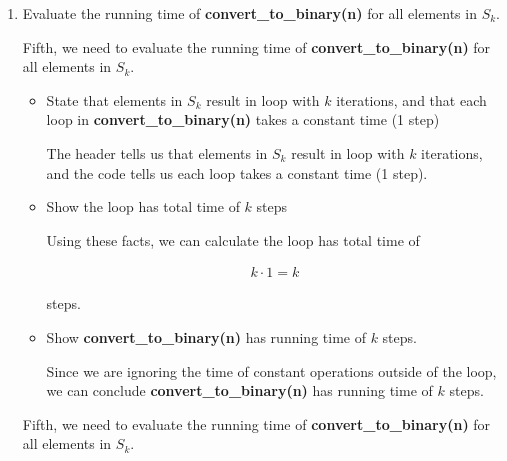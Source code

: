 \documentclass[12pt]{article}
\begin{document}
\begin{enumerate}[a.]
\begin{mdframed}
\begin{enumerate}[1.]
\begin{mdframed}
        \end{mdframed}

        \item Evaluate the running time of \textbf{convert\_to\_binary(n)} for all
        elements in $S_k$.

        \bigskip

        Fifth, we need to evaluate the running time of \textbf{convert\_to\_binary(n)}
        for all elements in $S_k$.

        \bigskip

        \begin{itemize}
            \item State that elements in $S_k$ result in loop with $k$ iterations, and
            that each loop in \textbf{convert\_to\_binary(n)} takes
            a constant time (1 step)

            \begin{mdframed}
            The header tells us that elements in $S_k$ result in loop with $k$ iterations, and
            the code tells us each loop takes a constant time (1 step).
            \end{mdframed}

            \item Show the loop has total time of $k$ steps

            \begin{mdframed}
            Using these facts, we can calculate the loop has total time of

            \begin{align}
                k \cdot 1 = k
            \end{align}

            steps.
            \end{mdframed}

            \item Show \textbf{convert\_to\_binary(n)} has running time of $k$ steps.

            \begin{mdframed}
            Since we are ignoring the time of constant operations outside of the loop,
            we can conclude \textbf{convert\_to\_binary(n)} has running time of $k$ steps.
            \end{mdframed}
        \end{itemize}

        \begin{mdframed}

        Fifth, we need to evaluate the running time of \textbf{convert\_to\_binary(n)}
        for all elements in $S_k$.


\end{mdframed}
\end{enumerate}
\end{mdframed}
\end{enumerate}
\end{document}
